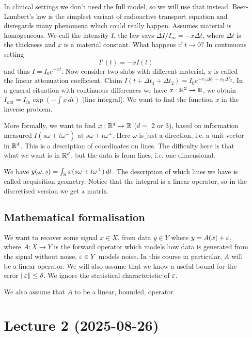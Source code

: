 \documentclass[12pt]{article}
\begin{document}
In clinical settings we don't need the full model, so we will use that instead. Beer-Lambert's law is the simplest variant of radioactive transport equation and disregards many phenomena which could really happen. Assumes material is homogeneous. We call the intensity $I$, the law says $\Delta I/I_{in} = - x\Delta t$, where $\Delta t$ is the thickness and $x$ is a material constant. What happens if $t\to 0$? In continuous setting
\begin{equation*}
    I'(t) = -xI(t)
\end{equation*}
and thus $I= I_0e^{-xt}$. Now consider two slabs with different material, $x$ is called the linear attenuation coefficient. Claim $I(t+\Delta t_1+\Delta t_2) = I_0e^{-x_1\Delta t_1 - x_2 \Delta t_2}$. In a general situation with continuous differences we have $x:\mathbb{R}^2\to\mathbb{R}$, we obtain $I_{out} = I_{in}\exp(-\int x \, dt)$ (line integral). We want to find the function $x$ in the inverse problem.

More formally, we want to find $x:\mathbb{R}^d\to\mathbb{R}$ ($d=$ 2 or 3), based on information measured $I(s\omega+t\omega^\perp)$ at $s\omega+t\omega^\perp$. Here $\omega$ is just a direction, i.e. a unit vector in $\mathbb{R}^d$. This is a description of coordinates on lines. The difficulty here is that what we want is in $\mathbb{R}^d$, but the data is from lines, i.e. one-dimensional.

We have $y(\omega,s) = \int_{\mathbb{R}} x(s\omega+t\omega^\perp) \, dt$. The description of which lines we have is called acquisition geometry. Notice that the integral is a linear operator, so in the discretised version we get a matrix. 

\subsection{Mathematical formalisation}
We want to recover some signal $x\in X$, from data $y\in Y$ where $y=A(x)+\varepsilon$, where $A:X\to Y$ is the forward operator which models how data is generated from the signal without noise, $\varepsilon\in Y$ models noise. In this course in particular, $A$ will be a linear operator. We will also assume that we know a useful bound for the error $\left\lVert\varepsilon\right\rVert\leq \delta$. We ignore the statistical characteristic of $\varepsilon$.

We also assume that $A$ to be a linear, bounded, operator.

\newpage
\section{Lecture 2 (2025-08-26)}
\end{document}
